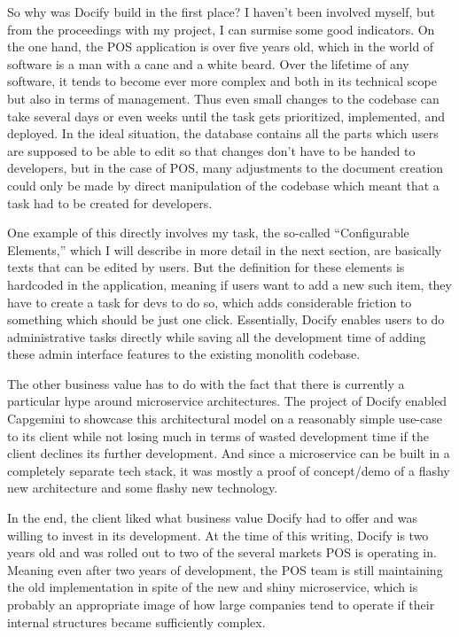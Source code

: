 So why was Docify build in the first place? I haven't been involved myself, but from the proceedings with my project, I can surmise some good indicators. On the one hand, the POS application is over five years old, which in the world of software is a man with a cane and a white beard. Over the lifetime of any software, it tends to become ever more complex and both in its technical scope but also in terms of management. Thus even small changes to the codebase can take several days or even weeks until the task gets prioritized, implemented, and deployed. In the ideal situation, the database contains all the parts which users are supposed to be able to edit so that changes don't have to be handed to developers, but in the case of POS, many adjustments to the document creation could only be made by direct manipulation of the codebase which meant that a task had to be created for developers.

One example of this directly involves my task, the so-called ``Configurable Elements,'' which I will describe in more detail in the next section, are basically texts that can be edited by users. But the definition for these elements is hardcoded in the application, meaning if users want to add a new such item, they have to create a task for devs to do so, which adds considerable friction to something which should be just one click. Essentially, Docify enables users to do administrative tasks directly while saving all the development time of adding these admin interface features to the existing monolith codebase.

The other business value has to do with the fact that there is currently a particular hype around microservice architectures. The project of Docify enabled Capgemini to showcase this architectural model on a reasonably simple use-case to its client while not losing much in terms of wasted development time if the client declines its further development. And since a microservice can be built in a completely separate tech stack, it was mostly a proof of concept/demo of a flashy new architecture and some flashy new technology.

In the end, the client liked what business value Docify had to offer and was willing to invest in its development. At the time of this writing, Docify is two years old and was rolled out to two of the several markets POS is operating in. Meaning even after two years of development, the POS team is still maintaining the old implementation in spite of the new and shiny microservice, which is probably an appropriate image of how large companies tend to operate if their internal structures became sufficiently complex.


